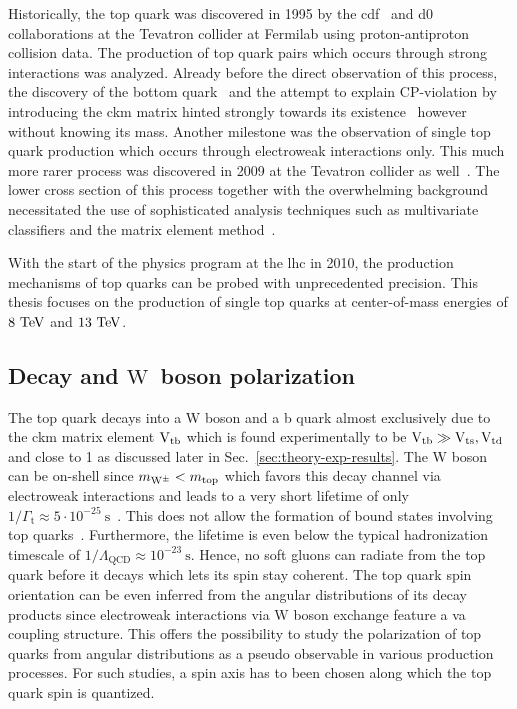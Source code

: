 Historically, the top quark was discovered in 1995 by the \gls{cdf}~\cite{Abe:1995hr} and \gls{d0}~\cite{Abachi:1994td} collaborations at the Tevatron collider at Fermilab using proton-antiproton collision data. The production of top quark pairs which occurs through strong interactions was analyzed. Already before the direct observation of this process, the discovery of the bottom quark~\cite{Augustin:1975yq,PhysRevLett.39.252} and the attempt to explain CP-violation by introducing the \gls{ckm} matrix hinted strongly towards its existence~\cite{Kobayashi01021973} however without knowing its mass. Another milestone was the observation of single top quark production which occurs through electroweak interactions only. This much more rarer process was discovered in 2009 at the Tevatron collider as well~\cite{PhysRevLett.103.092002,PhysRevLett.103.092001}. The lower cross section of this process together with the overwhelming background necessitated the use of sophisticated analysis techniques such as multivariate classifiers and the matrix element method~\cite{Mitrevski}.

With the start of the physics program at the \gls{lhc} in 2010, the production mechanisms of top quarks can be probed with unprecedented precision. This thesis focuses on the production of single top quarks at center-of-mass energies of $8~\mathrm{TeV}$ and $13~\mathrm{TeV}$.


\subsection{Decay and $\mathrm{W}$~boson polarization}
\label{sec:theory-top-quark-decay}

The top quark decays into a W boson and a b quark almost exclusively due to the \gls{ckm} matrix element ${\mathrm{V}_\mathrm{tb}}$ which is found experimentally to be ${\mathrm{V}_\mathrm{tb}}\gg{\mathrm{V}_\mathrm{ts}},{\mathrm{V}_\mathrm{td}}$ and close to 1 as discussed later in Sec.~\ref{sec:theory-exp-results}. The W boson can be on-shell since $m_{\mathrm{W}^{\pm}}<m_\mathrm{top}$ which favors this decay channel via electroweak interactions and leads to a very short lifetime of only $1/\Gamma_\mathrm{t}\approx 5\cdot10^{-25}~\mathrm{s}$~\cite{Olive:2016xmw}. This does not allow the formation of bound states involving top quarks~\cite{BIGI1986157}. Furthermore, the lifetime is even below the typical hadronization timescale of $1/\Lambda_\mathrm{QCD}\approx 10^{-23}~\mathrm{s}$. Hence, no soft gluons can radiate from the top quark before it decays which lets its spin stay coherent. The top quark spin orientation can be even inferred from the angular distributions of its decay products since electroweak interactions via $\mathrm{W}$ boson exchange feature a \gls{va} coupling structure. This offers the possibility to study the polarization of top quarks from angular distributions as a pseudo observable in various production processes. For such studies, a spin axis has to been chosen along which the top quark spin is quantized.

